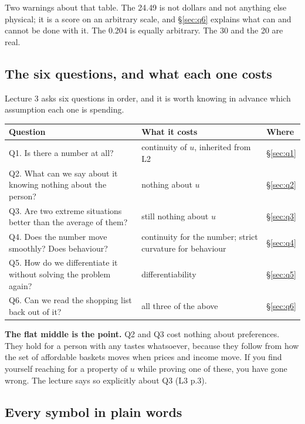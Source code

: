 \documentclass[11pt,letterpaper]{article}
\theoremstyle{definition}
\theoremstyle{plain}
\newcommand{\src}[1]{{\small\textsf{(#1)}}}
\begin{document}
Two warnings about that table. The 24.49 is not dollars and not anything else physical; it is a score
on an arbitrary scale, and \S\ref{sec:q6} explains what can and cannot be done with it. The 0.204 is
equally arbitrary. The 30 and the 20 are real.

\subsection{The six questions, and what each one costs}

Lecture 3 asks six questions in order, and it is worth knowing in advance which assumption each one
is spending.

\begin{center}
\begin{tabular}{@{}p{} p{} p{}@{}}
\toprule
\textbf{Question} & \textbf{What it costs} & \textbf{Where} \\
\midrule
Q1. Is there a number at all? & continuity of $u$, inherited from L2 & \S\ref{sec:q1} \\
Q2. What can we say about it knowing nothing about the person? & nothing about $u$ & \S\ref{sec:q2} \\
Q3. Are two extreme situations better than the average of them? & still nothing about $u$ & \S\ref{sec:q3} \\
Q4. Does the number move smoothly? Does behaviour? & continuity for the number; strict curvature for behaviour & \S\ref{sec:q4} \\
Q5. How do we differentiate it without solving the problem again? & differentiability & \S\ref{sec:q5} \\
Q6. Can we read the shopping list back out of it? & all three of the above & \S\ref{sec:q6} \\
\bottomrule
\end{tabular}
\end{center}

\textbf{The flat middle is the point.} Q2 and Q3 cost nothing about preferences. They hold for a
person with any tastes whatsoever, because they follow from how the set of affordable baskets moves
when prices and income move. If you find yourself reaching for a property of $u$ while proving one
of these, you have gone wrong. The lecture says so explicitly about Q3 \src{L3 p.3}.

\subsection{Every symbol in plain words}
\end{document}
